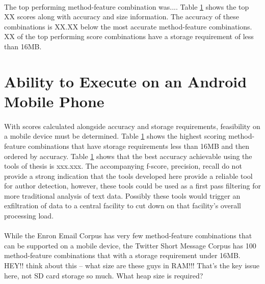\paragraph*{}  The top performing method-feature combination was....  Table \ref{} shows the top XX scores along with accuracy and size information.  The accuracy of these combinations is XX.XX below the most accurate method-feature combinations.  XX of the top performing score combinations have a storage requirement of less than 16MB.


\section{Ability to Execute on an Android Mobile Phone}
\paragraph*{} With scores calculated alongside accuracy and storage requirements, feasibility on a mobile device must be determined.  Table \ref{} shows the highest scoring method-feature combinations that have storage requirements less than 16MB and then ordered by accuracy.  Table \ref{} shows that the best accuracy achievable using the tools of thesis is xxx.xxx.  The accompanying f-score, precision, recall do not provide a strong indication that the tools developed here provide a reliable tool for author detection, however, these tools could be used as a first pass filtering for more traditional analysis of text data.  Possibly these tools would trigger an exfiltration of data to a central facility to cut down on that facility's overall processing load.

\paragraph*{} While the Enron Email Corpus has very few method-feature combinations that can be supported on a mobile device, the Twitter Short Message Corpus has 100 method-feature combinations that with a storage requirement under 16MB.  HEY!! think about this -- what size are these guys in RAM!!! That's the key issue here, not SD card storage so much. What heap size is required?
